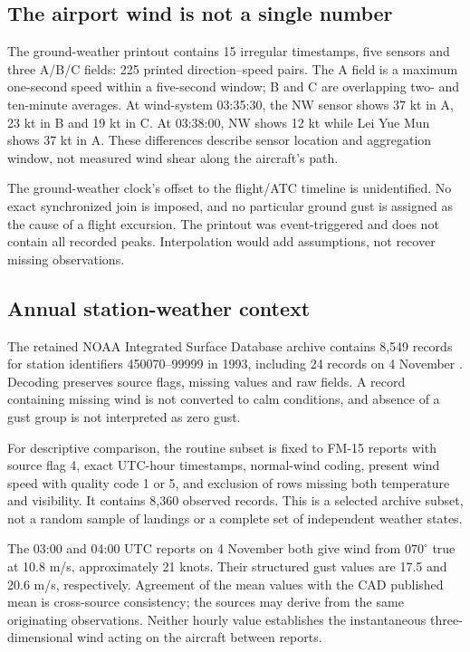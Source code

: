 \subsection{The airport wind is not a single number}
The ground-weather printout contains 15 irregular timestamps, five sensors and three A/B/C fields: 225 printed direction--speed pairs. The A field is a maximum one-second speed within a five-second window; B and C are overlapping two- and ten-minute averages. At wind-system 03:35:30, the NW sensor shows 37 kt in A, 23 kt in B and 19 kt in C. At 03:38:00, NW shows 12 kt while Lei Yue Mun shows 37 kt in A. These differences describe sensor location and aggregation window, not measured wind shear along the aircraft's path.

The ground-weather clock's offset to the flight/ATC timeline is unidentified. No exact synchronized join is imposed, and no particular ground gust is assigned as the cause of a flight excursion. The printout was event-triggered and does not contain all recorded peaks. Interpolation would add assumptions, not recover missing observations.

\subsection{Annual station-weather context}
The retained NOAA Integrated Surface Database archive contains 8,549 records for station identifiers 450070--99999 in 1993, including 24 records on 4 November \cite{noaa,isd}. Decoding preserves source flags, missing values and raw fields. A record containing missing wind is not converted to calm conditions, and absence of a gust group is not interpreted as zero gust.

For descriptive comparison, the routine subset is fixed to FM-15 reports with source flag 4, exact UTC-hour timestamps, normal-wind coding, present wind speed with quality code 1 or 5, and exclusion of rows missing both temperature and visibility. It contains 8,360 observed records. This is a selected archive subset, not a random sample of landings or a complete set of independent weather states.

The 03:00 and 04:00 UTC reports on 4 November both give wind from $070^\circ$ true at 10.8 m/s, approximately 21 knots. Their structured gust values are 17.5 and 20.6 m/s, respectively. Agreement of the mean values with the CAD published mean is cross-source consistency; the sources may derive from the same originating observations. Neither hourly value establishes the instantaneous three-dimensional wind acting on the aircraft between reports.

